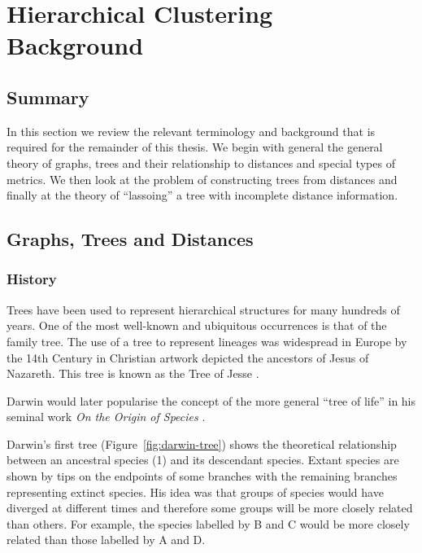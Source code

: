 \chapter{Hierarchical Clustering Background}
\label{cha:background2}

\section{Summary}
\label{sec:summary}

In this section we review the relevant terminology and background that is
required for the remainder of this thesis.  We begin with general the general
theory of graphs, trees and their relationship to distances and special types
of metrics.  We then look at the problem of constructing trees from distances
and finally at the theory of ``lassoing'' a tree with incomplete distance
information.

\section{Graphs, Trees and Distances}
\label{sec:graphs-trees-dist}

\subsection{History}
\label{sec:history}

Trees have been used to represent hierarchical structures for many hundreds of
years.  One of the most well-known and ubiquitous occurrences is that of the
family tree.  The use of a tree to represent lineages was widespread in Europe
by the 14th Century in Christian artwork depicted the ancestors of Jesus of
Nazareth.  This tree is known as the Tree of Jesse \cite{corblet1860etude}.

Darwin would later popularise the concept of the more general ``tree of life''
in his seminal work \textit{On the Origin of Species}
\cite{darwin1859origin}.

Darwin's first tree (Figure~\ref{fig:darwin-tree}) shows the theoretical
relationship between an ancestral species (1) and its descendant species.
Extant species are shown by tips on the endpoints of some branches with the
remaining branches representing extinct species.  His idea was that groups of
species would have diverged at different times and therefore some groups will
be more closely related than others.  For example, the species labelled by B
and C would be more closely related than those labelled by A and D.

